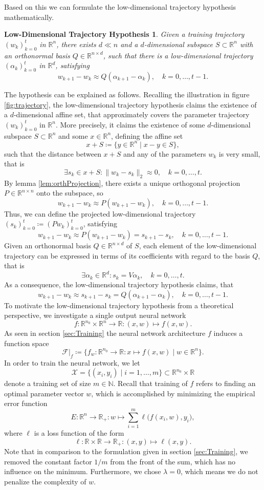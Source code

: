 \documentclass[11pt, a4paper]{article}
\newtheorem*{hypothesis}{Low-Dimensional Trajectory Hypothesis}
\newcommand{\N}{\mathbb{N}}
\newcommand{\R}{\mathbb{R}}
\newcommand{\F}{\mathcal{F}}
\newcommand{\X}{\mathcal{X}}
\begin{document}
Based on this we can formulate the low-dimensional trajectory hypothesis mathematically.

\begin{hypothesis}
Given a training trajectory $(w_k)_{k=0}^{t}$ in $\R^n$, there exists $d \ll n$ and a $d$-dimensional subspace $S \subset \R^n$ with an orthonormal basis $Q \in \R^{n \times d}$, such that there is a low-dimensional trajectory $(\alpha_k)_{k=0}^{t}$ in $\R^d$, satisfying 
\[ w_{k+1} - w_k \approx Q(\alpha_{k+1} - \alpha_k), \quad k=0, \dots, t-1. \]
\end{hypothesis}
The hypothesis can be explained as follows. Recalling the illustration in figure \ref{fig:trajectory}, the low-dimensional trajectory hypothesis claims the existence of a $d$-dimensional affine set, that approximately covers the parameter trajectory $(w_k)_{k=0}^{t}$ in $\R^n$. More precisely, it claims the existence of some $d$-dimensional subspace $S \subset \R^n$ and some $x \in \R^n$, defining the affine set
\[ x + S \coloneq \big \{ y \in \R^n \mid x - y \in S \big \}, \]
such that the distance between $x + S$ and any of the parameters $w_k$ is very small, that is
\[ \exists s_k \in x + S : \big \| w_k - s_k \big \|_2 \approx 0, \quad k=0, \dots, t. \]
By lemma \ref{lem:orthProjection}, there exists a unique orthogonal projection $P \in \R^{n \times n}$ onto the subspace, so
\[ w_{k+1} - w_k \approx P(w_{k+1} - w_k), \quad k=0, \dots, t-1. \]
Thus, we can define the projected low-dimensional trajectory $(s_k)_{k=0}^{t} \coloneq (Pw_k)_{k=0}^{t}$, satisfying
\[ w_{k+1} - w_k \approx P(w_{k+1} - w_k) = s_{k+1} - s_k, \quad k=0, \dots, t-1. \]
Given an orthonormal basis $Q \in \R^{n \times d}$ of $S$, each element of the low-dimensional trajectory can be expressed in terms of its coefficients with regard to the basis $Q$, that is
\[ \exists \alpha_k \in \R^{d}: s_k = V\alpha_k, \quad k=0, \dots, t. \]
As a consequence, the low-dimensional trajectory hypothesis claims, that
\[ w_{k+1} - w_k \approx s_{k+1} - s_k = Q(\alpha_{k+1} - \alpha_k), \quad k=0, \dots, t-1. \]
To motivate the low-dimensional trajectory hypothesis from a theoretical perspective, we investigate a single output neural network
\[ f: \R^{n_0} \times \R^n \to \R : (x,w) \mapsto f(x,w). \]
As seen in section \ref{sec:Training} the neural network architecture $f$ induces a function space
\[ \F |_{f} \coloneq \Big \{ f_w : \R^{n_0} \to \R : x \mapsto f(x,w) \mid w \in \R^n \Big \}. \]
In order to train the neural network, we let
\[ \X = \big \{ (x_i,y_i) \mid i=1, \dots, m \big \} \subset \R^{n_0} \times \R \] 
denote a training set of size $m \in \N$. Recall that training of $f$ refers to finding an optimal parameter vector $w$, which is accomplished by minimizing the empirical error function
\[ E : \R^n \to \R_+ : w \mapsto \sum_{i=1}^{m} \ell \big (f(x_i,w), y_i \big ), \]
where $\ell$ is a loss function of the form
\[ \ell: \R \times \R \to \R_+ : (x,y) \mapsto \ell(x,y). \]
Note that in comparison to the formulation given in section \ref{sec:Training}, we removed the constant factor $1/m$ from the front of the sum, which has no influence on the minimum. Furthermore, we chose $\lambda = 0$, which means we do not penalize the complexity of $w$. \\
\end{document}
